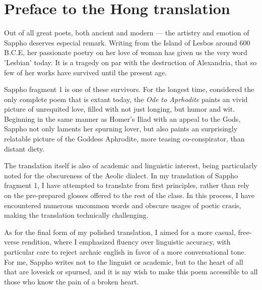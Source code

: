 \section*{Preface to the Hong translation}
Out of all great poets, both ancient and modern --- the artistry and emotion of Sappho deserves especial remark. Writing from the Island of Lesbos around 600 B.C.E, her passionate poetry on her love of woman has given us the very word 'Lesbian' today. It is a tragedy on par with the destruction of Alexandria, that so few of her works have survived until the present age.

Sappho fragment 1 is one of these survivors. For the longest time, considered the only complete poem that is extant today, the \emph{Ode to Aprhodite} paints an vivid picture of unrequited love, filled with not just longing, but humor and wit. Beginning in the same manner as Homer's Iliad with an appeal to the Gods, Sappho not only laments her spurning lover, but also paints an surprisingly relatable picture of the Goddess Aphrodite, more teasing co-conspirator, than distant diety.

The translation itself is also of academic and linguistic interest, being particularly noted for the obscureness of the Aeolic dialect. In my translation of Sappho fragment 1, I have attempted to translate from first principles, rather than rely on the pre-prepared glosses offered to the rest of the class. In this process, I have encountered numerous uncommon words and obscure usages of poetic crasis, making the translation technically challenging.

As for the final form of my polished translation, I aimed for a more casual, free-verse rendition, where I emphasized fluency over linguistic accuracy, with particular care to reject archaic english in favor of a more conversational tone. For me, Sappho writes not to the linguist or academic, but to the heart of all that are lovesick or spurned, and it is my wish to make this poem accessible to all those who know the pain of a broken heart.
